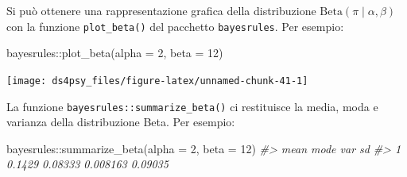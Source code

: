 \documentclass[
  11pt,
]{krantz}
\makeatletter
\newenvironment{Shaded}{\begin{snugshade}}{\end{snugshade}}
\newcommand{\AttributeTok}[1]{\textcolor[rgb]{0.61,0.61,0.61}{#1}}
\newcommand{\CommentTok}[1]{\textcolor[rgb]{0.37,0.37,0.37}{\textit{#1}}}
\newcommand{\DecValTok}[1]{\textcolor[rgb]{0.06,0.06,0.06}{#1}}
\newcommand{\FunctionTok}[1]{\textcolor[rgb]{0,0,0}{#1}}
\newcommand{\NormalTok}[1]{#1}
\newcommand{\SpecialCharTok}[1]{\textcolor[rgb]{0,0,0}{#1}}
\newenvironment{kframe}{%
\medskip{}
\setlength{\fboxsep}{.8em}
 \def\at@end@of@kframe{}%
 \ifinner\ifhmode%
  \def\at@end@of@kframe{\end{minipage}}%
  \begin{minipage}{\columnwidth}%
 \fi\fi%
 \def\FrameCommand##1{\hskip\@totalleftmargin \hskip-\fboxsep
 \colorbox{shadecolor}{##1}\hskip-\fboxsep
     \hskip-\linewidth \hskip-\@totalleftmargin \hskip\columnwidth}%
 \MakeFramed {\advance\hsize-\width
   \@totalleftmargin\z@ \linewidth\hsize
   \@setminipage}}%
 {\par\unskip\endMakeFramed%
 \at@end@of@kframe}
\renewenvironment{Shaded}{\begin{kframe}}{\end{kframe}}
\theoremstyle{definition}
\theoremstyle{definition}
\theoremstyle{definition}
\theoremstyle{definition}
\theoremstyle{remark}
\makeatother
\begin{document}
Si può ottenere una rappresentazione grafica della distribuzione \(\mbox{Beta}(\pi \mid \alpha, \beta)\) con la funzione \texttt{plot\_beta()} del pacchetto \texttt{bayesrules}. Per esempio:

\begin{Shaded}
\begin{Highlighting}[]
\NormalTok{bayesrules}\SpecialCharTok{::}\FunctionTok{plot\_beta}\NormalTok{(}\AttributeTok{alpha =} \DecValTok{2}\NormalTok{, }\AttributeTok{beta =} \DecValTok{12}\NormalTok{)}
\end{Highlighting}
\end{Shaded}

\begin{center}\texttt{[image: ds4psy\_files/figure-latex/unnamed-chunk-41-1]} \end{center}

La funzione \texttt{bayesrules::summarize\_beta()} ci restituisce la media, moda e varianza della distribuzione Beta. Per esempio:

\begin{Shaded}
\begin{Highlighting}[]
\NormalTok{bayesrules}\SpecialCharTok{::}\FunctionTok{summarize\_beta}\NormalTok{(}\AttributeTok{alpha =} \DecValTok{2}\NormalTok{, }\AttributeTok{beta =} \DecValTok{12}\NormalTok{)}
\CommentTok{\#\textgreater{}     mean    mode      var      sd}
\CommentTok{\#\textgreater{} 1 0.1429 0.08333 0.008163 0.09035}
\end{Highlighting}
\end{Shaded}
\end{document}
